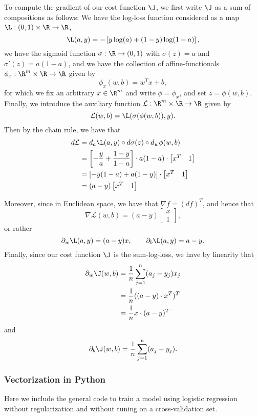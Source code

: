 To compute the gradient of our cost function $\J$, we first write $\J$ as a sum of compositions as follows:  We have the log-loss function considered as a map $\L:(0,1)\times\R\to\R$,
$$\L(a,y)=-\left[y\log(a)+(1-y)\log(1-a)\right],$$
we have the sigmoid function $\sigma:\R\to(0,1)$ with $\sigma(z)=a$ and $\sigma'(z)=a(1-a)$, and we have the collection of affine-functionals $\phi_x:\R^m\times\R\to\R$ given by
$$\phi_x(w,b)=w^Tx+b,$$
for which we fix an arbitrary $x\in\R^m$ and write $\phi=\phi_x$, and set $z=\phi(w,b)$.  Finally, we introduce the auxiliary function $\mathcal{L}:\R^m\times\R\to\R$ given by
$$\mathcal{L}(w,b)=\L(\sigma(\phi(w,b)),y).$$
Then by the chain rule, we have that
\begin{align*}
	d\mathcal{L}&=d_a\L(a,y)\circ d\sigma(z)\circ d_w\phi(w,b)\\
	&=\left[-\frac{y}{a}+\frac{1-y}{1-a}\right]\cdot a(1-a)\cdot\begin{bmatrix}
		x^T&1
	\end{bmatrix}\\
	&=[-y(1-a)+a(1-y)]\cdot \begin{bmatrix}
		x^T&1
	\end{bmatrix}\\
	&=(a-y)\begin{bmatrix}
		x^T&1
	\end{bmatrix}
\end{align*}

Moreover, since in Euclidean space, we have that $\nabla f = (df)^T$, and hence that
$$\nabla\mathcal{L}(w,b)=(a-y)\begin{bmatrix}
	x\\
	1
\end{bmatrix},$$
or rather
$$\partial_w\L(a,y)=(a-y)x,\qquad \partial_b\L(a,y)=a-y.$$
Finally, since our cost function $\J$ is the sum-log-loss, we have by linearity that
\begin{align*}
	\partial_w\J(w,b)&=\frac{1}{n}\sum_{j=1}^n(a_j-y_j)x_j\\
	&=\frac{1}{n}((a-y)\cdot x^T)^T\\
	&=\frac{1}{n}x\cdot(a-y)^T
\end{align*}
and
$$\partial_b\J(w,b)=\frac{1}{n}\sum_{j=1}^n(a_j-y_j).$$


\subsubsection{Vectorization in Python}
Here we include the general code to train a model using logistic regression without regularization and without tuning on a cross-validation set.

